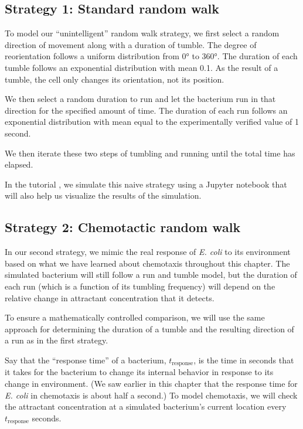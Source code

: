 \FloatBarrier
{}
\subsection{Strategy 1: Standard random walk}

To model our ``unintelligent'' random walk strategy, we first select a random direction of movement along with a duration of tumble. The degree of reorientation follows a uniform distribution from 0° to 360°. The duration of each tumble follows an exponential distribution with mean 0.1. As the result of a tumble, the cell only changes its orientation, not its position.

We then select a random duration to run and let the bacterium run in that direction for the specified amount of time. The duration of each run follows an exponential distribution with mean equal to the experimentally verified value of 1 second.

We then iterate these two steps of tumbling and running until the total time has elapsed.

In the tutorial , we simulate this naive strategy using a Jupyter notebook that will also help us visualize the results of the simulation.

\FloatBarrier
{}
\subsection{Strategy 2: Chemotactic random walk}


In our second strategy, we mimic the real response of \textit{E. coli} to its environment based on what we have learned about chemotaxis throughout this chapter. The simulated bacterium will still follow a run and tumble model, but the duration of each run (which is a function of its tumbling frequency) will depend on the relative change in attractant concentration that it detects.

To ensure a mathematically controlled comparison, we will use the same approach for determining the duration of a tumble and the resulting direction of a run as in the first strategy.

Say that the ``response time'' of a bacterium, $t_{\text{response}}$, is the time in seconds that it takes for the bacterium to change its internal behavior in response to its change in environment. (We saw earlier in this chapter that the response time for \textit{E. coli} in chemotaxis is about half a second.) To model chemotaxis, we will check the attractant concentration at a simulated bacterium's current location every $t_{\text{response}}$ seconds.

